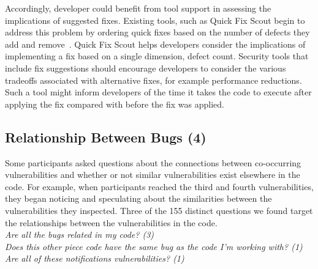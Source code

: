 \documentclass[conference]{IEEEtran}
\begin{document}
Accordingly, developer could benefit from tool support in assessing the implications of suggested fixes.
Existing tools, such as Quick Fix Scout begin to address this problem by ordering quick fixes based on the number of defects they add and remove~\cite{mucslu2012speculative}.
Quick Fix Scout helps developers consider the implications of implementing a fix based on a single dimension, defect count.
Security tools that include fix suggestions should encourage developers to consider the various tradeoffs associated with alternative fixes, for example performance reductions.
Such a tool might inform developers of the time it takes the code to execute after applying the fix compared with before the fix was applied.



\noindent\subsection{\textbf{Relationship Between Bugs (4)}}\label{rbb}

Some participants asked questions about the connections between co-occurring vulnerabilities and whether or not similar vulnerabilities exist elsewhere in the code. 
For example, when participants reached the third and fourth vulnerabilities, they began noticing and speculating about the similarities between the vulnerabilities they inspected.
Three of the 155 distinct questions we found target the relationships between the vulnerabilities in the code. 
\\

\noindent\emph{Are all the bugs related in my code? (3)} \\
\emph{Does this other piece code have the same bug as the code I'm working with? (1)} \\
\emph{Are all of these notifications vulnerabilities? (1)} \\
\end{document}
